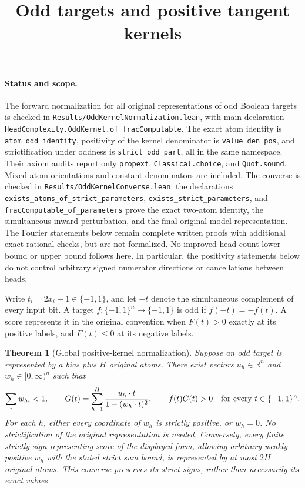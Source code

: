 \documentclass[11pt]{article}
\newtheorem{theorem}{Theorem}
\begin{document}
\title{Odd targets and positive tangent kernels}
\author{}
\date{}
\maketitle

\paragraph{Status and scope.}
The forward normalization for all original representations of odd Boolean
targets is checked in \texttt{Results/OddKernelNormalization.lean}, with
main declaration \texttt{HeadComplexity.OddKernel.of\_fracComputable}.
The exact atom identity is \texttt{atom\_odd\_identity}, positivity of
the kernel denominator is \texttt{value\_den\_pos}, and strictification
under oddness is \texttt{strict\_odd\_part}, all in the same namespace.
Their axiom audits report only \texttt{propext}, \texttt{Classical.choice},
and \texttt{Quot.sound}. Mixed atom orientations and constant denominators
are included. The converse is checked in
\texttt{Results/OddKernelConverse.lean}: the declarations
\texttt{exists\_atoms\_of\_strict\_parameters},
\texttt{exists\_strict\_parameters}, and
\texttt{fracComputable\_of\_parameters} prove the exact two-atom identity,
the simultaneous inward perturbation, and the final original-model
representation. The Fourier statements below remain complete written
proofs with additional exact rational checks, but are not formalized.
No improved head-count lower bound or upper bound follows here. In particular, the
positivity statements below do not control arbitrary signed numerator
directions or cancellations between heads.

Write $t_i=2x_i-1\in\{-1,1\}$, and let $-t$ denote the simultaneous
complement of every input bit. A target $f:\{-1,1\}^n\to\{-1,1\}$ is
odd if $f(-t)=-f(t)$. A score represents it in the original convention
when $F(t)>0$ exactly at its positive labels, and $F(t)\leq0$ at its
negative labels.

\begin{theorem}[Global positive-kernel normalization]
Suppose an odd target is represented by a bias plus $H$ original atoms.
There exist vectors $u_h\in\mathbb R^n$ and $w_h\in[0,\infty)^n$ such that
\[
 \sum_i w_{hi}<1,\qquad
 G(t)=\sum_{h=1}^H\frac{u_h\cdot t}{1-(w_h\cdot t)^2},\qquad
 f(t)G(t)>0\quad\hbox{for every }t\in\{-1,1\}^n.
\]
For each $h$, either every coordinate of $w_h$ is strictly positive,
or $w_h=0$. No strictification of the original representation is needed.
Conversely, every finite strictly sign-representing score of the displayed
form, allowing arbitrary weakly positive $w_h$ with the stated strict
sum bound, is represented by at most $2H$ original atoms. This converse
preserves its strict signs, rather than necessarily its exact values.
\end{theorem}
\end{document}
